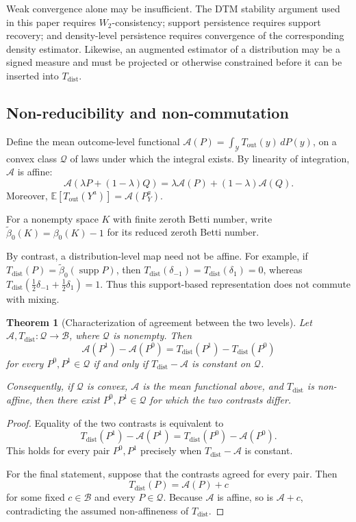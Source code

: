 \documentclass[11pt,a4paper]{article}
\theoremstyle{plain}
\newtheorem{theorem}{Theorem}[section]
\theoremstyle{definition}
\theoremstyle{remark}
\newcommand{\1}{\mathbbm{1}}
\begin{document}
Weak convergence alone may be insufficient. The DTM stability argument used in this paper requires \(W_2\)-consistency; support persistence requires support recovery; and density-level persistence requires convergence of the corresponding density estimator. Likewise, an augmented estimator of a distribution may be a signed measure and must be projected or otherwise constrained
before it can be inserted into \(T_{\mathrm{dist}}\).

\subsection{Non-reducibility and non-commutation}
\label{subsec:noncommutation}

Define the mean outcome-level functional \(\mathcal A(P) =\int_{\mathcal Y}T_{\mathrm{out}}(y)\,dP(y)\), on a convex class \(\mathcal Q\) of laws under which the integral exists. By linearity of integration, \(\mathcal A\) is affine:
\[
\mathcal A(\lambda P+(1-\lambda)Q)
=
\lambda\mathcal A(P)+(1-\lambda)\mathcal A(Q).
\]
Moreover, \(\mathbb E[T_{\mathrm{out}}(Y^a)] = \mathcal A(P_Y^a)\).


For a nonempty space \(K\) with finite zeroth Betti number, write \(\widetilde\beta_0(K)=\beta_0(K)-1\) for its reduced zeroth Betti number.

By contrast, a distribution-level map need not be affine. For example, if
\(T_{\mathrm{dist}}(P) = \widetilde\beta_0(\operatorname{supp}P)\), then \(T_{\mathrm{dist}}(\delta_{-1})=
T_{\mathrm{dist}}(\delta_1)=0\), whereas
\(T_{\mathrm{dist}}\left( \frac12\delta_{-1}+\frac12\delta_1
\right)=1\). Thus this support-based representation does not commute with mixing.

\begin{theorem}[Characterization of agreement between the two levels]
\label{thm:noncommutation-characterization}
Let
\(\mathcal A,T_{\mathrm{dist}}:\mathcal Q\to\mathcal B\), where \(\mathcal Q\) is nonempty. Then
\[
\mathcal A(P^1)-\mathcal A(P^0)
=
T_{\mathrm{dist}}(P^1)-T_{\mathrm{dist}}(P^0)
\]
for every \(P^0,P^1\in\mathcal Q\) if and only if
\(T_{\mathrm{dist}}-\mathcal A\) is constant on \(\mathcal Q\).

Consequently, if \(\mathcal Q\) is convex, \(\mathcal A\) is the mean functional above, and \(T_{\mathrm{dist}}\) is non-affine, then there exist \(P^0,P^1\in\mathcal Q\) for which the two contrasts differ.
\end{theorem}

\begin{proof}
Equality of the two contrasts is equivalent to
\[
T_{\mathrm{dist}}(P^1)-\mathcal A(P^1)
=
T_{\mathrm{dist}}(P^0)-\mathcal A(P^0).
\]
This holds for every pair \(P^0,P^1\) precisely when
\(T_{\mathrm{dist}}-\mathcal A\) is constant.

For the final statement, suppose that the contrasts agreed for every pair. Then
\[
T_{\mathrm{dist}}(P)=\mathcal A(P)+c
\]
for some fixed \(c\in\mathcal B\) and every \(P\in\mathcal Q\). Because \(\mathcal A\) is affine, so is \(\mathcal A+c\), contradicting the assumed non-affineness of \(T_{\mathrm{dist}}\).
\end{proof}
\end{document}
